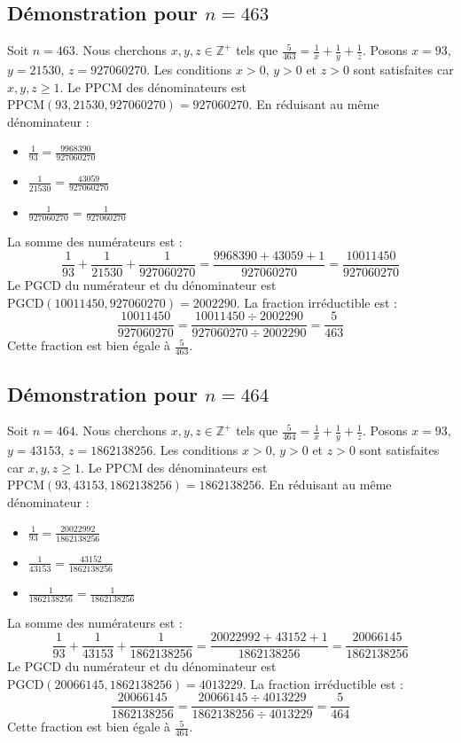 \documentclass[11pt,a4paper]{article}
\begin{document}
\subsection{Démonstration pour $n = 463$}
Soit $n = 463$. Nous cherchons $x, y, z \in \mathbb{Z}^{+}$ tels que $\frac{5}{463} = \frac{1}{x} + \frac{1}{y} + \frac{1}{z}$.
Posons $x = 93$, $y = 21530$, $z = 927060270$.
Les conditions $x > 0$, $y > 0$ et $z > 0$ sont satisfaites car $x, y, z \geq 1$.
Le PPCM des dénominateurs est $\text{PPCM}(93, 21530, 927060270) = 927060270$.
En réduisant au même dénominateur :
\begin{itemize}
    \item $\frac{1}{93} = \frac{9968390}{927060270}$
    \item $\frac{1}{21530} = \frac{43059}{927060270}$
    \item $\frac{1}{927060270} = \frac{1}{927060270}$
\end{itemize}
La somme des numérateurs est :
$$ \frac{1}{93} + \frac{1}{21530} + \frac{1}{927060270} = \frac{9968390 + 43059 + 1}{927060270} = \frac{10011450}{927060270} $$
Le PGCD du numérateur et du dénominateur est $\text{PGCD}(10011450, 927060270) = 2002290$.
La fraction irréductible est :
$$ \frac{10011450}{927060270} = \frac{10011450 \div 2002290}{927060270 \div 2002290} = \frac{5}{463} $$
Cette fraction est bien égale à $\frac{5}{463}$.

\subsection{Démonstration pour $n = 464$}
Soit $n = 464$. Nous cherchons $x, y, z \in \mathbb{Z}^{+}$ tels que $\frac{5}{464} = \frac{1}{x} + \frac{1}{y} + \frac{1}{z}$.
Posons $x = 93$, $y = 43153$, $z = 1862138256$.
Les conditions $x > 0$, $y > 0$ et $z > 0$ sont satisfaites car $x, y, z \geq 1$.
Le PPCM des dénominateurs est $\text{PPCM}(93, 43153, 1862138256) = 1862138256$.
En réduisant au même dénominateur :
\begin{itemize}
    \item $\frac{1}{93} = \frac{20022992}{1862138256}$
    \item $\frac{1}{43153} = \frac{43152}{1862138256}$
    \item $\frac{1}{1862138256} = \frac{1}{1862138256}$
\end{itemize}
La somme des numérateurs est :
$$ \frac{1}{93} + \frac{1}{43153} + \frac{1}{1862138256} = \frac{20022992 + 43152 + 1}{1862138256} = \frac{20066145}{1862138256} $$
Le PGCD du numérateur et du dénominateur est $\text{PGCD}(20066145, 1862138256) = 4013229$.
La fraction irréductible est :
$$ \frac{20066145}{1862138256} = \frac{20066145 \div 4013229}{1862138256 \div 4013229} = \frac{5}{464} $$
Cette fraction est bien égale à $\frac{5}{464}$.
\end{document}
